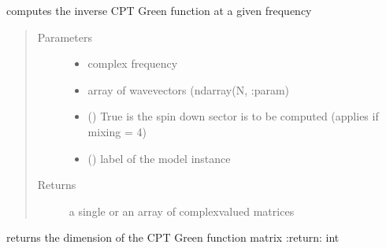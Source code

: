 \documentclass[letterpaper,10pt,english]{sphinxmanual}
\begin{document}
\begin{fulllineitems}
\label{\detokenize{functions:pyqcm.CPT_Green_function_inverse}}
\sphinxAtStartPar
computes the inverse CPT Green function at a given frequency
\begin{quote}\begin{description}
\item[{Parameters}] \leavevmode\begin{itemize}
\item {} 
\sphinxAtStartPar
{} \textendash{} complex frequency

\item {} 
\sphinxAtStartPar
{} \textendash{} array of wavevectors (ndarray(N,  :param)

\item {} 
\sphinxAtStartPar
{} () \textendash{} True is the spin down sector is to be computed (applies if mixing = 4)

\item {} 
\sphinxAtStartPar
{} () \textendash{} label of the model instance

\end{itemize}

\item[{Returns}] \leavevmode
\sphinxAtStartPar
a single or an array of complex\sphinxhyphen{}valued matrices

\end{description}\end{quote}

\end{fulllineitems}


\begin{fulllineitems}
\label{\detokenize{functions:pyqcm.Green_function_dimension}}
\sphinxAtStartPar
returns the dimension of the CPT Green function matrix
:return: int

\end{fulllineitems}
\end{document}
